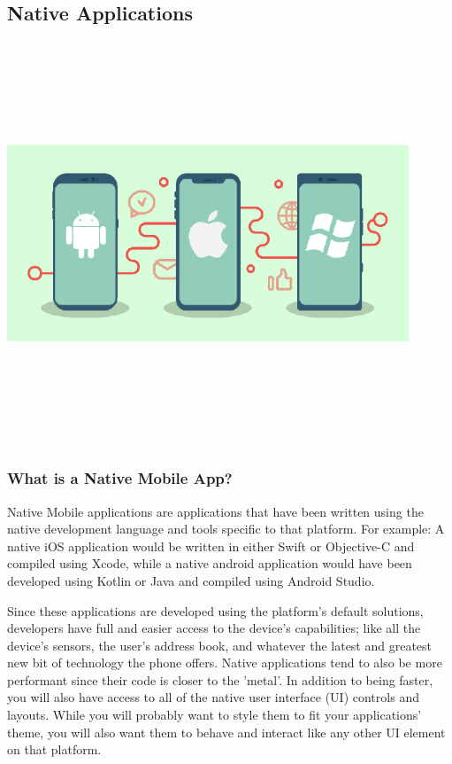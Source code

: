 \subsection{Native Applications}
\par
\medskip
\begin{center}
    \includegraphics[width=12cm,height=12cm,keepaspectratio]{Images/nativeapp2.png}
\end{center}
\subsubsection{What is a Native Mobile App?}
Native Mobile applications are applications that have been written using the native development language and tools specific to that platform. For example: A native iOS application would be written in either Swift or Objective-C and compiled using Xcode, while a native android application would have been developed using Kotlin or Java and compiled using Android Studio.\newline

Since these applications are developed using the platform's default solutions, developers have full and easier access to the device's capabilities; like all the device's sensors, the user's address book, and whatever the latest and greatest new bit of technology the phone offers. Native applications tend to also be more performant since their code is closer to the 'metal'. In addition to being faster, you will also have access to all of the native user interface (UI) controls and layouts. While you will probably want to style them to fit your applications' theme, you will also want them to behave and interact like any other UI element on that platform.\newline

